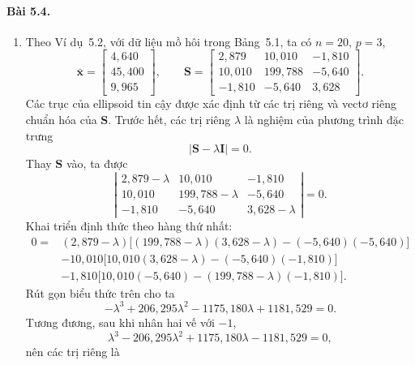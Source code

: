 \paragraph{Bài 5.4.}
\begin{enumerate}[label=(\alph*)]
    \item Theo Ví dụ~5.2, với dữ liệu mồ hôi trong Bảng~5.1, ta có $n=20$, $p=3$,
    \[
        \bar{\mathbf{x}} =
        \begin{bmatrix}
            4{,}640\\
            45{,}400\\
            9{,}965
        \end{bmatrix},
        \qquad
        \mathbf{S} =
        \begin{bmatrix}
            2{,}879 & 10{,}010 & -1{,}810\\
            10{,}010 & 199{,}788 & -5{,}640\\
            -1{,}810 & -5{,}640 & 3{,}628
        \end{bmatrix}.
    \]
    Các trục của ellipsoid tin cậy được xác định từ các trị riêng và vectơ riêng chuẩn hóa của $\mathbf{S}$. Trước hết, các trị riêng $\lambda$ là nghiệm của phương trình đặc trưng
    \[
        \left|\mathbf{S}-\lambda\mathbf{I}\right|=0.
    \]
    Thay $\mathbf{S}$ vào, ta được
    \[
        \left|
        \begin{matrix}
            2{,}879-\lambda & 10{,}010 & -1{,}810\\
            10{,}010 & 199{,}788-\lambda & -5{,}640\\
            -1{,}810 & -5{,}640 & 3{,}628-\lambda
        \end{matrix}
        \right| = 0.
    \]
    Khai triển định thức theo hàng thứ nhất:
    \[
    \begin{aligned}
        0={}&(2{,}879-\lambda)
        \bigl[(199{,}788-\lambda)(3{,}628-\lambda)-(-5{,}640)(-5{,}640)\bigr]\\
        &-10{,}010
        \bigl[10{,}010(3{,}628-\lambda)-(-5{,}640)(-1{,}810)\bigr]\\
        &-1{,}810
        \bigl[10{,}010(-5{,}640)-(199{,}788-\lambda)(-1{,}810)\bigr].
    \end{aligned}
    \]
    Rút gọn biểu thức trên cho ta
    \[
        -\lambda^3 + 206{,}295\lambda^2
        - 1175{,}180\lambda + 1181{,}529 = 0.
    \]
    Tương đương, sau khi nhân hai vế với $-1$,
    \[
        \lambda^3 - 206{,}295\lambda^2
        + 1175{,}180\lambda - 1181{,}529 = 0,
    \]
    nên các trị riêng là

\end{enumerate}
